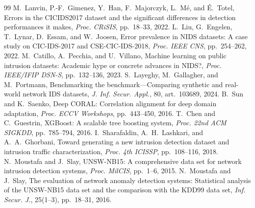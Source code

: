 \documentclass[11pt,a4paper]{article}
\begin{document}
\begin{thebibliography}{99}
 M.~Lanvin, P.-F.~Gimenez, Y.~Han, F.~Majorczyk, L.~M\'e, and \'E.~Totel, Errors in the CICIDS2017 dataset and the significant differences in detection performances it makes, \emph{Proc. CRiSIS}, pp.~18--33, 2022.
 L.~Liu, G.~Engelen, T.~Lynar, D.~Essam, and W.~Joosen, Error prevalence in NIDS datasets: A case study on CIC-IDS-2017 and CSE-CIC-IDS-2018, \emph{Proc. IEEE CNS}, pp.~254--262, 2022.
 M.~Catillo, A.~Pecchia, and U.~Villano, Machine learning on public intrusion datasets: Academic hype or concrete advances in NIDS?, \emph{Proc. IEEE/IFIP DSN-S}, pp.~132--136, 2023.
 S.~Layeghy, M.~Gallagher, and M.~Portmann, Benchmarking the benchmark---Comparing synthetic and real-world network IDS datasets, \emph{J. Inf. Secur. Appl.}, 80, art.~103689, 2024.
 B.~Sun and K.~Saenko, Deep CORAL: Correlation alignment for deep domain adaptation, \emph{Proc. ECCV Workshops}, pp.~443--450, 2016.
 T.~Chen and C.~Guestrin, XGBoost: A scalable tree boosting system, \emph{Proc. 22nd ACM SIGKDD}, pp.~785--794, 2016.
 I.~Sharafaldin, A.~H.~Lashkari, and A.~A.~Ghorbani, Toward generating a new intrusion detection dataset and intrusion traffic characterization, \emph{Proc. 4th ICISSP}, pp.~108--116, 2018.
 N.~Moustafa and J.~Slay, UNSW-NB15: A comprehensive data set for network intrusion detection systems, \emph{Proc. MilCIS}, pp.~1--6, 2015.
 N.~Moustafa and J.~Slay, The evaluation of network anomaly detection systems: Statistical analysis of the UNSW-NB15 data set and the comparison with the KDD99 data set, \emph{Inf. Secur. J.}, 25(1--3), pp.~18--31, 2016.
\end{thebibliography}
\end{document}
